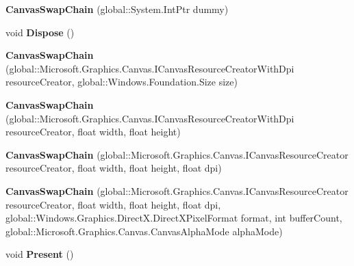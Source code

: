 \begin{DoxyCompactItemize}
{\bfseries Canvas\+Swap\+Chain} (global\+::\+System.\+Int\+Ptr dummy)
\item 
\mbox{\label{class_microsoft_1_1_graphics_1_1_canvas_1_1_canvas_swap_chain_aa07ba3151a28bffab0828ea35cbe8aff}} 
void {\bfseries Dispose} ()
\item 
\mbox{\label{class_microsoft_1_1_graphics_1_1_canvas_1_1_canvas_swap_chain_a4c0dc1805f7d1ee90d0aaa3d685cce75}} 
{\bfseries Canvas\+Swap\+Chain} (global\+::\+Microsoft.\+Graphics.\+Canvas.\+I\+Canvas\+Resource\+Creator\+With\+Dpi resource\+Creator, global\+::\+Windows.\+Foundation.\+Size size)
\item 
\mbox{\label{class_microsoft_1_1_graphics_1_1_canvas_1_1_canvas_swap_chain_a26637921bfc09432963a1a68273083d5}} 
{\bfseries Canvas\+Swap\+Chain} (global\+::\+Microsoft.\+Graphics.\+Canvas.\+I\+Canvas\+Resource\+Creator\+With\+Dpi resource\+Creator, float width, float height)
\item 
\mbox{\label{class_microsoft_1_1_graphics_1_1_canvas_1_1_canvas_swap_chain_aaafc853ef669866291a8d037e900b55f}} 
{\bfseries Canvas\+Swap\+Chain} (global\+::\+Microsoft.\+Graphics.\+Canvas.\+I\+Canvas\+Resource\+Creator resource\+Creator, float width, float height, float dpi)
\item 
\mbox{\label{class_microsoft_1_1_graphics_1_1_canvas_1_1_canvas_swap_chain_a06c8c4d3a0f23349f3487a07eea4e047}} 
{\bfseries Canvas\+Swap\+Chain} (global\+::\+Microsoft.\+Graphics.\+Canvas.\+I\+Canvas\+Resource\+Creator resource\+Creator, float width, float height, float dpi, global\+::\+Windows.\+Graphics.\+Direct\+X.\+Direct\+X\+Pixel\+Format format, int buffer\+Count, global\+::\+Microsoft.\+Graphics.\+Canvas.\+Canvas\+Alpha\+Mode alpha\+Mode)
\item 
\mbox{\label{class_microsoft_1_1_graphics_1_1_canvas_1_1_canvas_swap_chain_a8dfcb6a20dfa7505601d2376461eb5c4}} 
void {\bfseries Present} ()
\item 

\end{DoxyCompactItemize}

